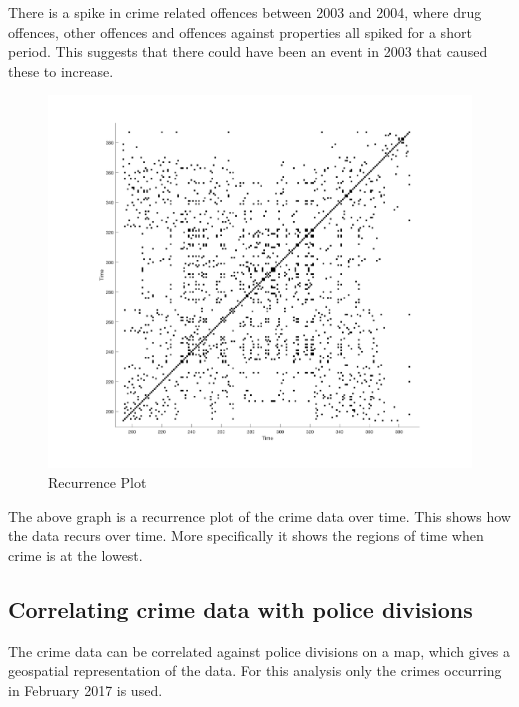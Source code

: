 \documentclass[]{article}
\begin{document}
There is a spike in crime related offences between 2003 and 2004, where drug offences, other offences
and offences against properties all spiked for a short period. This suggests that
there could have been an event in 2003 that caused these to increase.

\begin{figure}[H]
    \caption{Recurrence Plot}
    \centering
    \includegraphics[width=\linewidth]{../images/recurrence_plot}
\end{figure}

The above graph is a recurrence plot of the crime data over time.
This shows how the data recurs over time.
More specifically it shows the regions of time when crime is at the lowest.


\subsection{Correlating crime data with police divisions}

The crime data can be correlated against police divisions on a map, which gives a
geospatial representation of the data.
For this analysis only the crimes occurring in February 2017 is used.
\end{document}
